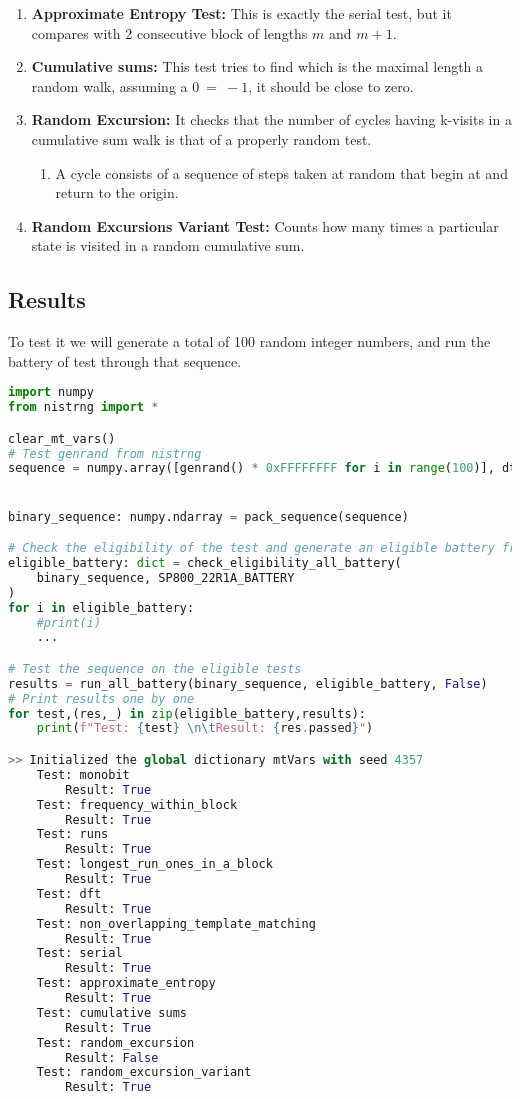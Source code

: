 \begin{enumerate}
\item  \textbf{Approximate Entropy Test: }This is exactly the serial test, but it compares with 2 consecutive block of lengths $m$ and $m+1$.

\item \textbf{ Cumulative sums: }This test tries to find which is the maximal length a random walk, assuming a $0\ =\ -1$, it should be close to zero.

\item \textbf{ Random Excursion: }It checks that the number of cycles having k-visits in a cumulative sum walk is that of a properly random test.

\begin{enumerate}
\item A cycle consists of a sequence of steps taken at random that begin at and return to the origin.
\end{enumerate}

\item \textbf{ Random Excursions Variant Test: }Counts how many times a particular state is visited in a random cumulative sum.
\end{enumerate}

\subsection{Results}
To test it we will generate a total of 100 random integer numbers, and run the battery of test through that sequence.
\begin{lstlisting}[language=Python]
import numpy
from nistrng import *

clear_mt_vars()
# Test genrand from nistrng
sequence = numpy.array([genrand() * 0xFFFFFFFF for i in range(100)], dtype=numpy.uint64)


binary_sequence: numpy.ndarray = pack_sequence(sequence)

# Check the eligibility of the test and generate an eligible battery from the default NIST-sp800-22r1a battery
eligible_battery: dict = check_eligibility_all_battery(
    binary_sequence, SP800_22R1A_BATTERY
)
for i in eligible_battery:
    #print(i)
    ...

# Test the sequence on the eligible tests
results = run_all_battery(binary_sequence, eligible_battery, False)
# Print results one by one
for test,(res,_) in zip(eligible_battery,results):
    print(f"Test: {test} \n\tResult: {res.passed}")

>> Initialized the global dictionary mtVars with seed 4357
    Test: monobit 
    	Result: True
    Test: frequency_within_block 
    	Result: True
    Test: runs 
    	Result: True
    Test: longest_run_ones_in_a_block 
    	Result: True
    Test: dft 
    	Result: True
    Test: non_overlapping_template_matching 
    	Result: True
    Test: serial 
    	Result: True
    Test: approximate_entropy 
    	Result: True
    Test: cumulative sums 
    	Result: True
    Test: random_excursion 
    	Result: False
    Test: random_excursion_variant 
    	Result: True
\end{lstlisting}

